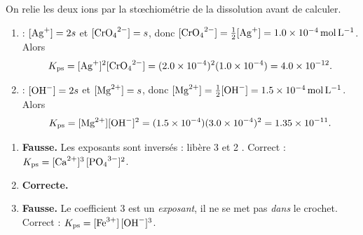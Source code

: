 \documentclass[11pt,a4paper]{article}
\begin{document}
\begin{corrige}
On relie les deux ions par la stœchiométrie de la dissolution avant de calculer.
\begin{enumerate}[label=\alph*)]
  \item {} : $[\ce{Ag+}]=2s$ et $[\ce{CrO4^{2-}}]=s$, donc
        $[\ce{CrO4^{2-}}]=\tfrac{1}{2}[\ce{Ag+}]=\qty{1.0e-4}{\mole\per\litre}$. Alors
        \[ K_{\mathrm{ps}} = [\ce{Ag+}]^{2}[\ce{CrO4^{2-}}] = (\num{2.0e-4})^{2}(\num{1.0e-4}) = \num{4.0e-12}. \]
  \item {} : $[\ce{OH-}]=2s$ et $[\ce{Mg^{2+}}]=s$, donc
        $[\ce{Mg^{2+}}]=\tfrac{1}{2}[\ce{OH-}]=\qty{1.5e-4}{\mole\per\litre}$. Alors
        \[ K_{\mathrm{ps}} = [\ce{Mg^{2+}}][\ce{OH-}]^{2} = (\num{1.5e-4})(\num{3.0e-4})^{2} = \num{1.35e-11}. \]
\end{enumerate}
\end{corrige}

\begin{corrige}
\begin{enumerate}[label=\alph*)]
  \item \textbf{Fausse.} Les exposants sont inversés :  libère 3  et 2
        . Correct : $K_{\mathrm{ps}} = [\ce{Ca^{2+}}]^{3}\,[\ce{PO4^{3-}}]^{2}$.
  \item \textbf{Correcte.}
  \item \textbf{Fausse.} Le coefficient $3$ est un \emph{exposant}, il ne se met pas \emph{dans} le
        crochet. Correct : $K_{\mathrm{ps}} = [\ce{Fe^{3+}}]\,[\ce{OH-}]^{3}$.
\end{enumerate}
\end{corrige}
\end{document}
